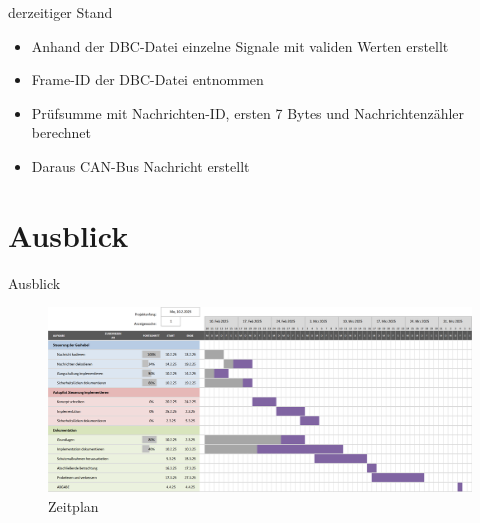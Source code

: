 \documentclass[usenames, dvipsnames, aspectratio=75]{beamer}
\begin{document}
\begin{frame}{derzeitiger Stand}
    \begin{itemize}
        \item Anhand der DBC-Datei einzelne Signale mit validen Werten erstellt
        \item Frame-ID der DBC-Datei entnommen
        \item Prüfsumme mit Nachrichten-ID, ersten 7 Bytes und Nachrichtenzähler berechnet
        \item Daraus CAN-Bus Nachricht erstellt
    \end{itemize}
    
\end{frame}


\section{Ausblick}
\begin{frame}{Ausblick}
    \begin{figure}
        \centering
        \includegraphics[width=1\linewidth]{assets/Zeitplan.png}
        \caption{Zeitplan}
    \end{figure}
\end{frame}

\end{document}
